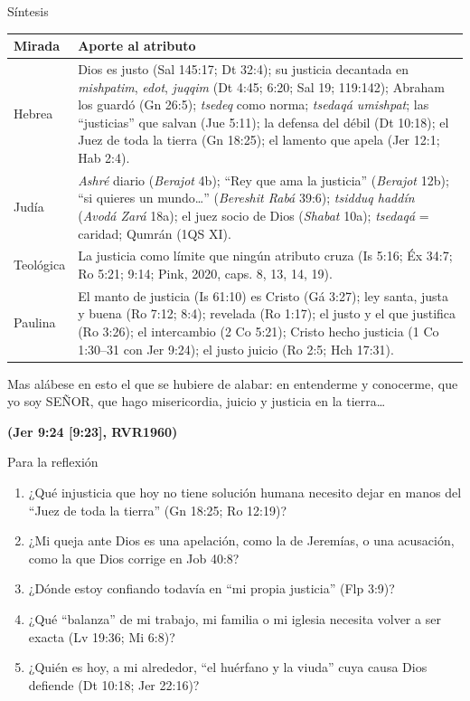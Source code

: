 \documentclass[hyperref={bookmarks=false},aspectratio=169]{beamer}
\newcommand{\SENOR}{S{\fontsize{0.78em}{1em}\selectfont EÑOR}}
\newcommand{\fuente}[1]{\par\hfill{\upshape\bfseries\footnotesize\textcolor{azul}{#1}}}
\begin{document}
\begin{frame}{Síntesis}
\scriptsize\renewcommand{\arraystretch}{1.18}
\begin{tabular}{@{}>{\RaggedRight\arraybackslash}p{1.6cm}>{\RaggedRight\arraybackslash}p{10.6cm}@{}}
\toprule
\textbf{Mirada} & \textbf{Aporte al atributo} \\ \midrule
Hebrea & Dios es justo (Sal 145:17; Dt 32:4); su justicia decantada en \emph{mishpatim}, \emph{edot}, \emph{juqqim} (Dt 4:45; 6:20; Sal 19; 119:142); Abraham los guardó (Gn 26:5); \emph{tsedeq} como norma; \emph{tsedaqá umishpat}; las ``justicias'' que salvan (Jue 5:11); la defensa del débil (Dt 10:18); el Juez de toda la tierra (Gn 18:25); el lamento que apela (Jer 12:1; Hab 2:4). \\
Judía & \emph{Ashré} diario (\emph{Berajot} 4b); ``Rey que ama la justicia'' (\emph{Berajot} 12b); ``si quieres un mundo\ldots'' (\emph{Bereshit Rabá} 39:6); \emph{tsidduq haddín} (\emph{Avodá Zará} 18a); el juez socio de Dios (\emph{Shabat} 10a); \emph{tsedaqá} = caridad; Qumrán (1QS XI). \\
Teológica & La justicia como límite que ningún atributo cruza (Is 5:16; Éx 34:7; Ro 5:21; 9:14; Pink, 2020, caps. 8, 13, 14, 19). \\
Paulina & El manto de justicia (Is 61:10) es Cristo (Gá 3:27); ley santa, justa y buena (Ro 7:12; 8:4); revelada (Ro 1:17); el justo y el que justifica (Ro 3:26); el intercambio (2 Co 5:21); Cristo hecho justicia (1 Co 1:30--31 con Jer 9:24); el justo juicio (Ro 2:5; Hch 17:31). \\
\bottomrule
\end{tabular}\par\medskip
\begin{cita}Mas alábese en esto el que se hubiere de alabar: en entenderme y conocerme, que yo soy \SENOR, que hago misericordia, juicio y justicia en la tierra\ldots\fuente{(Jer 9:24 [9:23], RVR1960)}\end{cita}
\end{frame}

\begin{frame}{Para la reflexión}
\small
\begin{enumerate}
\item ¿Qué injusticia que hoy no tiene solución humana necesito dejar en manos del ``Juez de toda la tierra'' (Gn 18:25; Ro 12:19)?
\item ¿Mi queja ante Dios es una apelación, como la de Jeremías, o una acusación, como la que Dios corrige en Job 40:8?
\item ¿Dónde estoy confiando todavía en ``mi propia justicia'' (Flp 3:9)?
\item ¿Qué ``balanza'' de mi trabajo, mi familia o mi iglesia necesita volver a ser exacta (Lv 19:36; Mi 6:8)?
\item ¿Quién es hoy, a mi alrededor, ``el huérfano y la viuda'' cuya causa Dios defiende (Dt 10:18; Jer 22:16)?
\end{enumerate}
\end{frame}
\end{document}
